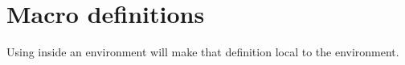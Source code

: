 \vspace{-1cm}
\section[Macro definitions]{Macro definitions \noncurs}
\vspace{-.2cm}
\begin{latex}
  \newcommand{\mat}[1]{\mathcal{M}_{#1}(\mathbb{R})}
\newcommand*{\dx}[1][x]{\, \mathrm{d}#1}
\renewcommand{\contentsname}{Cuprins}

\usepackage{xparse}
\newenvironment{\name}{begin}{end}

\end{latex}

Using \code{\renewcommand} inside an environment will make that definition local 
to the environment.

